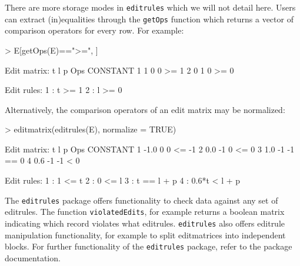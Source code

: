 \documentclass[11pt, fleqn, a4paper]{article}
\begin{document}
There are more storage modes in {\tt editrules} which we will
not detail here. Users can extract
(in)equalities through the {\tt getOps} function which returns a vector of
comparison operators for every row. For example:
\begin{Schunk}
\begin{Sinput}
> E[getOps(E)==">=", ]
\end{Sinput}
\begin{Soutput}
Edit matrix:
  t l p Ops CONSTANT
1 1 0 0  >=        1
2 0 1 0  >=        0

Edit rules:
1 : t >= 1 
2 : l >= 0  
\end{Soutput}
\end{Schunk}
Alternatively, the comparison operators of an edit matrix may be normalized:
\begin{Schunk}
\begin{Sinput}
> editmatrix(editrules(E), normalize = TRUE)
\end{Sinput}
\begin{Soutput}
Edit matrix:
     t  l  p Ops CONSTANT
1 -1.0  0  0  <=       -1
2  0.0 -1  0  <=        0
3  1.0 -1 -1  ==        0
4  0.6 -1 -1   <        0

Edit rules:
1 : 1 <= t 
2 : 0 <= l 
3 : t == l + p 
4 : 0.6*t < l + p  
\end{Soutput}
\end{Schunk}
The {\tt editrules} package offers functionality to check data against any set
of editrules. The function {\tt violatedEdits}, for example returns a boolean
matrix indicating which record violates what editrules. {\tt editrules} also
offers editrule manipulation functionality, for example to split editmatrices
into independent blocks. For further functionality of the {\tt editrules}
package, refer to the package documentation.
\end{document}
